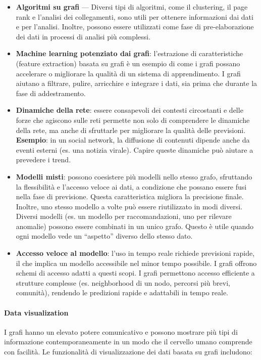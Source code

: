 \begin{itemize}
    \item \textbf{Algoritmi su grafi} — Diversi tipi di algoritmi, come il clustering, il page rank e l’analisi dei collegamenti, 
    sono utili per ottenere informazioni dai dati e per l’analisi. Inoltre, possono essere utilizzati come fase di 
    pre-elaborazione dei dati in processi di analisi più complessi.
    \item \textbf{Machine learning potenziato dai grafi}: l’estrazione di caratteristiche (feature extraction) basata su grafi è un esempio di come i grafi possano accelerare o migliorare la qualità di un sistema di apprendimento. I grafi aiutano a filtrare, pulire, arricchire e integrare i dati, sia prima che durante la fase di addestramento.
    \item \textbf{Dinamiche della rete}: essere consapevoli dei contesti circostanti e delle forze che agiscono sulle reti 
    permette non solo di comprendere le dinamiche della rete, ma anche di sfruttarle per migliorare la qualità delle previsioni. \textbf{Esempio}: in un social network, la diffusione di contenuti dipende anche da eventi esterni (es. una notizia virale). Capire queste dinamiche può aiutare a prevedere i trend.
    \item \textbf{Modelli misti}: possono coesistere più modelli nello stesso grafo, sfruttando la flessibilità e l’accesso veloce ai dati, a condizione che possano essere fusi nella fase di previsione. Questa caratteristica migliora la precisione finale. Inoltre, uno stesso modello a volte può essere riutilizzato in modi diversi. Diversi modelli (es. un modello per raccomandazioni, uno per rilevare anomalie) possono essere combinati in un unico grafo. Questo è utile quando ogni modello vede un “aspetto” diverso dello stesso dato.
    \item \textbf{Accesso veloce al modello}: l’uso in tempo reale richiede previsioni rapide, il che implica un modello 
    accessibile nel minor tempo possibile. I grafi offrono schemi di accesso adatti a questi scopi. I grafi permettono accesso efficiente a strutture complesse (es. neighborhood di un nodo, percorsi più brevi, comunità), rendendo le predizioni rapide e adattabili in tempo reale.
\end{itemize}

\paragraph{Data visualization}I grafi hanno un elevato potere comunicativo e possono mostrare più tipi di informazione contemporaneamente in un modo che il cervello umano comprende con facilità. Le funzionalità di visualizzazione dei dati basata su grafi includono:

